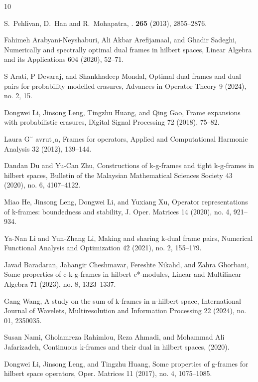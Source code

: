 \documentclass[final,1p,times]{elsarticle}
\begin{document}
		 
\begin{thebibliography}{10}

	
S.~Pehlivan, D.~Han and R.~Mohapatra,
.
 \textbf{265} (2013), 2855--2876.

Fahimeh Arabyani-Neyshaburi, Ali Akbar Arefijamaal, and Ghadir Sadeghi, Numerically and spectrally optimal
dual frames in hilbert spaces, Linear Algebra and its Applications 604 (2020), 52–71.

S Arati, P Devaraj, and Shankhadeep Mondal, Optimal dual frames and dual pairs for probability modelled
erasures, Advances in Operator Theory 9 (2024), no. 2, 15.

Dongwei Li, Jinsong Leng, Tingzhu Huang, and Qing Gao, Frame expansions with probabilistic erasures, Digital
Signal Processing 72 (2018), 75–82.

Laura G˘ avrut¸a, Frames for operators, Applied and Computational Harmonic Analysis 32 (2012), 139–144.

 Dandan Du and Yu-Can Zhu, Constructions of k-g-frames and tight k-g-frames in hilbert spaces, Bulletin of the
Malaysian Mathematical Sciences Society 43 (2020), no. 6, 4107–4122.

Miao He, Jinsong Leng, Dongwei Li, and Yuxiang Xu, Operator representations of k-frames: boundedness and
stability, J. Oper. Matrices 14 (2020), no. 4, 921–934.

 Ya-Nan Li and Yun-Zhang Li, Making and sharing k-dual frame pairs, Numerical Functional Analysis and
Optimization 42 (2021), no. 2, 155–179.

 Javad Baradaran, Jahangir Cheshmavar, Fereshte Nikahd, and Zahra Ghorbani, Some properties of c-k-g-frames in
hilbert c*-modules, Linear and Multilinear Algebra 71 (2023), no. 8, 1323–1337.

 Gang Wang, A study on the sum of k-frames in n-hilbert space, International Journal of Wavelets, Multiresolution
and Information Processing 22 (2024), no. 01, 2350035.

Susan Nami, Gholamreza Rahimlou, Reza Ahmadi, and Mohammad Ali Jafarizadeh, Continuous k-frames and
their dual in hilbert spaces, (2020).


Dongwei Li, Jinsong Leng, and Tingzhu Huang, Some properties of g-frames for hilbert space operators, Oper.
Matrices 11 (2017), no. 4, 1075–1085.



\end{thebibliography}
\end{document}
